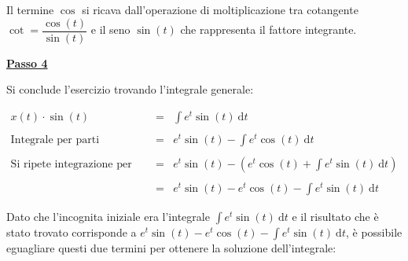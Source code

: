 \documentclass[a4paper]{article}
\begin{document}
	\noindent
	Il termine $\cos$ si ricava dall'operazione di moltiplicazione tra cotangente $\cot = \dfrac{\cos\left(t\right)}{\sin\left(t\right)}$ e il seno $\sin\left(t\right)$ che rappresenta il fattore integrante.
	
	\newpage
	
	\noindent
	\textcolor{Red3}{\textbf{\underline{Passo 4}}}\newline
	
	\noindent
	Si conclude l'esercizio trovando l'integrale generale:
	
	\begin{equation*}
		\begin{array}{lll}
			x\left(t\right) \cdot \sin\left(t\right) 	& = & \displaystyle\int e^{t} \sin\left(t\right) \: \mathrm{d}t \\
			&& \\
			\text{Integrale per parti}					& = & e^{t} \sin\left(t\right) - \displaystyle\int e^{t} \cos\left(t\right) \: \mathrm{d}t \\
			&& \\
			\text{Si ripete integrazione per parti}		& = & e^{t} \sin\left(t\right) - \left(e^{t} \cos\left(t\right) + \displaystyle\int e^{t} \sin\left(t\right) \: \mathrm{d}t \right) \\
			&& \\
														& = & e^{t} \sin\left(t\right) - e^{t} \cos\left(t\right) - \displaystyle\int e^{t} \sin\left(t\right) \: \mathrm{d}t
		\end{array}
	\end{equation*}

	\noindent
	Dato che l'incognita iniziale era l'integrale $\int e^{t} \sin\left(t\right) \: \mathrm{d}t$ e il risultato che è stato trovato corrisponde a $e^{t} \sin\left(t\right) - e^{t} \cos\left(t\right) - \displaystyle\int e^{t} \sin\left(t\right) \: \mathrm{d}t$, è possibile eguagliare questi due termini per ottenere la soluzione dell'integrale:
	
\end{document}
